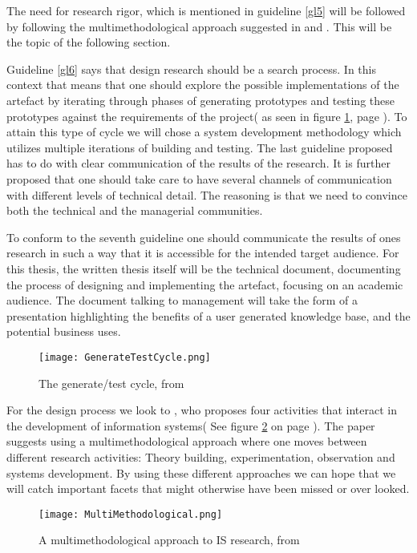 The need for research rigor, which is mentioned in guideline \ref{gl5} will be followed by following the multimethodological approach suggested in \citet{Chen1990} and \citet{NunamakerJr1990}. 
This will be the topic of the following section.

Guideline \ref{gl6} says that design research should be a search process. 
In this context that means that one should explore the possible implementations of the artefact by iterating through phases of generating prototypes and testing these prototypes against the requirements of the project( as seen in figure \ref{GenerateTestCycle}, page \pageref{GenerateTestCycle}).
To attain this type of cycle we will chose a system development methodology which utilizes multiple iterations of building and testing.
The last guideline proposed has to do with clear communication of the results of the research. 
It is further proposed that one should take care to have several channels of communication with different levels of technical detail.
The reasoning is that we need to convince both the technical and the managerial communities. 

To conform to the seventh guideline one should communicate the results of ones research in such a way that it is accessible for the intended target audience.
For this thesis, the written thesis itself will be the technical document, documenting the process of designing and implementing the artefact, focusing on an academic audience.
The document talking to management will take the form of a presentation highlighting the benefits of a user generated knowledge base, and the potential business uses.

\begin{figure}[h]
    \begin{center}
        \texttt{[image: GenerateTestCycle.png]}
        \caption{The generate/test cycle, from \protect \citet{Hevner2004}}
        \label{GenerateTestCycle}
    \end{center}
\end{figure}

For the design process we look to \citet{Chen1990}, who proposes four activities that interact in the development of information systems( See figure \ref{multi} on page \pageref{multi}). 
The paper suggests using a multimethodological approach where one moves between different research activities: Theory building, experimentation, observation and systems development.
By using these different approaches we can hope that we will catch important facets that might otherwise have been missed or over looked.   

\begin{figure}[h]
    \begin{center}
        \texttt{[image: MultiMethodological.png]}
        \caption{A multimethodological approach to IS research, from \protect \citet{Chen1990}}
        \label{multi}
    \end{center}
\end{figure}